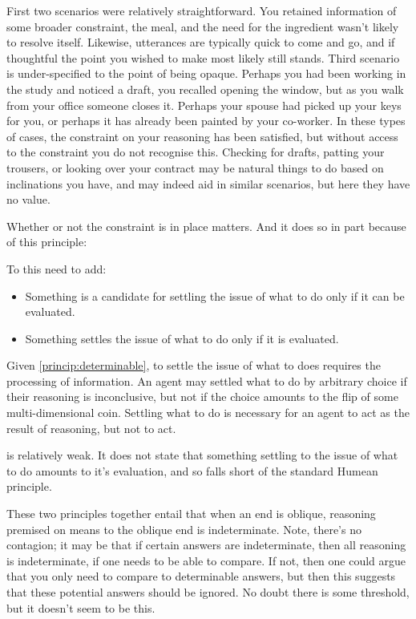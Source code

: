 \documentclass[10pt]{article}
\begin{document}
First two scenarios were relatively straightforward.
You retained information of some broader constraint, the meal, and the need for the ingredient wasn't likely to resolve itself.
Likewise, utterances are typically quick to come and go, and if thoughtful the point you wished to make most likely still stands.
Third scenario is under-specified to the point of being opaque.
Perhaps you had been working in the study and noticed a draft, you recalled opening the window, but as you walk from your office someone closes it.
Perhaps your spouse had picked up your keys for you, or perhaps it has already been painted by your co-worker.
In these types of cases, the constraint on your reasoning has been satisfied, but without access to the constraint you do not recognise this.
Checking for drafts, patting your trousers, or looking over your contract may be natural things to do based on inclinations you have, and may indeed aid in similar scenarios, but here they have no value.

Whether or not the constraint is in place matters.
And it does so in part because of this principle:

To this need to add:
\begin{principle}\label{princip:determinable}
  \begin{itemize}
  \item Something is a candidate for settling the issue of what to do only if it can be evaluated.
  \item Something settles the issue of what to do only if it is evaluated.
  \end{itemize}

\end{principle}
Given \autoref{princip:determinable}, to settle the issue of what to does requires the processing of information.
An agent may settled what to do by arbitrary choice if their reasoning is inconclusive, but not if the choice amounts to the flip of some multi-dimensional coin.
Settling what to do is necessary for an agent to act as the result of reasoning, but not to act.


is relatively weak.
It does not state that something settling to the issue of what to do amounts to it's evaluation, and so falls short of the standard Humean principle.



These two principles together entail that when an end is oblique, reasoning premised on means to the oblique end is indeterminate.
Note, there's no contagion; it may be that if certain answers are indeterminate, then all reasoning is indeterminate, if one needs to be able to compare.
If not, then one could argue that you only need to compare to determinable answers, but then this suggests that these potential answers should be ignored.
No doubt there is some threshold, but it doesn't seem to be this.
\end{document}
